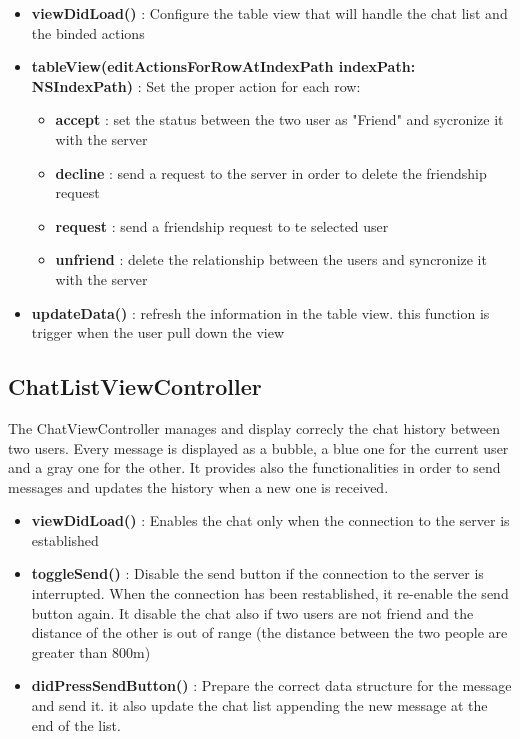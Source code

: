 \begin{itemize}

\item \textbf{viewDidLoad()} : Configure the table view that will handle the chat list and the binded actions

\item \textbf{tableView(editActionsForRowAtIndexPath indexPath: NSIndexPath)} : Set the proper action for each row:

\begin{itemize}
\item \textbf{accept} : set the status between the two user as "Friend" and sycronize it with the server
\item \textbf{decline} : send a request to the server in order to delete the friendship request
\item \textbf{request} : send a friendship request to te selected user
\item \textbf{unfriend} : delete the relationship between the users and syncronize it with the server

\end{itemize}

\item \textbf{updateData()} : refresh the information in the table view. this function is trigger when the user pull down the view

\end{itemize}

\subsection{ChatListViewController} 

The ChatViewController manages and display correcly the chat history between two users. Every message is displayed as a bubble, a blue one for the current user and a gray one for the other. It provides also the functionalities in order to send messages and updates the history when a new one is received.

\begin{itemize}

\item \textbf{viewDidLoad()} : Enables the chat only when the connection to the server is established
\item \textbf{toggleSend()} : Disable the send button if the connection to the server is interrupted. When the connection has been restablished, it re-enable the send button again. It disable the chat also if two users are not friend and the distance of the other is out of range (the distance between the two people are greater than 800m)
\item \textbf{didPressSendButton()} : Prepare the correct data structure for the message and send it. it also update the chat list appending the new message at the end of the list.
\end{itemize}

